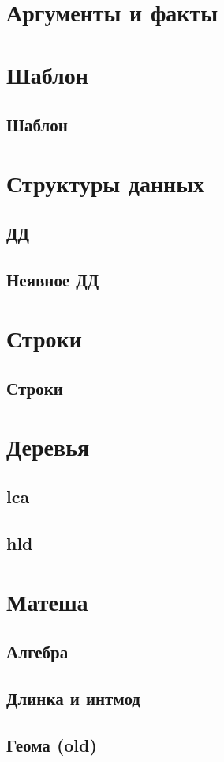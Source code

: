 \documentclass[10pt,landscape,a4paper]{article}
\newcommand{\includecpp}[2]{%
  \subsection{#1}%
}
\begin{document}
\begin{multicols}{3}

\section{Аргументы и факты}
% 

\section{Шаблон}
\includecpp{Шаблон}{./algos/template.cpp}

\section{Структуры данных}

\includecpp{ДД}{./algos/treap.cpp}
\includecpp{Неявное ДД}{./algos/implicit_treap.cpp}

\section{Строки}

\includecpp{Строки}{./algos/strings.cpp}

\section{Деревья}

\includecpp{lca}{./algos/lca.cpp}
\includecpp{hld}{./algos/hld.cpp}

\section{Матеша}

\includecpp{Алгебра}{./algos/algebra.cpp}
\includecpp{Длинка и интмод}{./algos/long_ar.cpp}
\includecpp{Геома (old)}{./algos/geometry.cpp}

\end{multicols}
\end{document}
